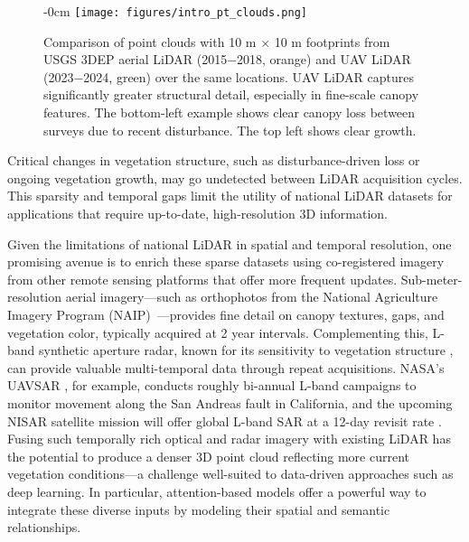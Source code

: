 \documentclass[remotesensing,article,accept,pdftex,moreauthors]{Definitions/mdpi}
\renewcommand{\hl}[1]{#1}
\begin{document}
\vspace{-5pt}
\begin{figure}[H]
\begin{adjustwidth}{-\extralength}{0cm}
    \centering
    \texttt{[image: figures/intro\_pt\_clouds.png]}
\end{adjustwidth}
\caption{\hl{Comparison} %
 of point clouds with 10 m × 10 m footprints from USGS 3DEP aerial LiDAR (2015−2018, orange) and UAV LiDAR (2023−2024, green) over the same locations. UAV LiDAR captures significantly greater structural detail, especially in fine-scale canopy features. The bottom-left example shows clear canopy loss between surveys due to recent disturbance. The top left shows clear growth.}
    \label{fig:intro_pt_clouds}
\end{figure}


Critical changes in vegetation structure, such as disturbance-driven loss or ongoing vegetation growth, may go undetected between LiDAR acquisition cycles. This sparsity and temporal gaps limit the utility of national LiDAR datasets for applications that require up-to-date, high-resolution 3D information.

Given the limitations of national LiDAR in spatial and temporal resolution, one promising avenue is to enrich these sparse datasets using co-registered imagery from other remote sensing platforms that offer more frequent updates. Sub-meter-resolution aerial imagery—such as orthophotos from the National Agriculture Imagery Program (NAIP)~\cite{usda_naip_2024}—provides fine detail on canopy textures, gaps, and vegetation color, typically acquired at 2 year intervals. Complementing this, L-band synthetic aperture radar, known for its sensitivity to vegetation structure \cite{wang2025interpretable}, can provide valuable multi-temporal data through repeat acquisitions. NASA’s UAVSAR \cite{rosen2006uavsar}, for example, conducts roughly bi-annual L-band campaigns to monitor movement along the San Andreas fault in California, and the upcoming NISAR satellite mission will offer global L-band SAR at a 12-day revisit rate \cite{kellogg2020nasa}. Fusing such temporally rich optical and radar imagery with existing LiDAR has the potential to produce a denser 3D point cloud reflecting more current vegetation conditions—a challenge well-suited to data-driven approaches such as deep learning. In particular, attention-based models offer a powerful way to integrate these diverse inputs by modeling their spatial and semantic relationships.
\end{document}
